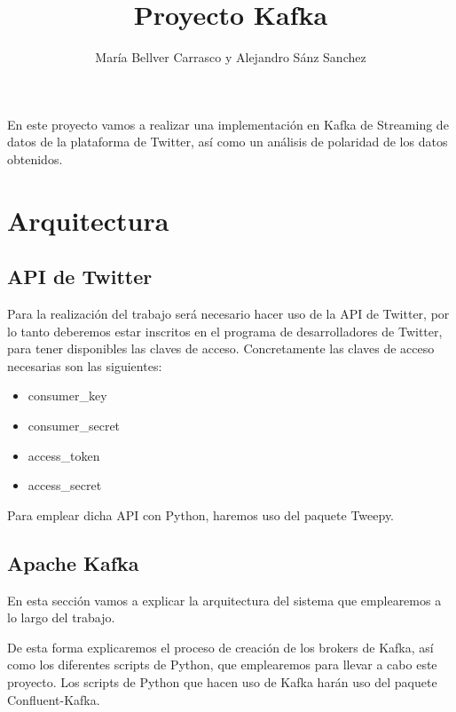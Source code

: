 \documentclass[12pt, a4paper, twoside]{article}
\title{Proyecto Kafka}
\author{María Bellver Carrasco y Alejandro Sánz Sanchez}
\begin{document}
\maketitle



En este proyecto vamos a realizar una implementación en Kafka de Streaming de datos de la plataforma de Twitter, así como un análisis de polaridad de los datos obtenidos.
	
\section{Arquitectura}
\subsection{API de Twitter}
	Para la realización del trabajo será necesario hacer uso de la API de Twitter, por lo tanto deberemos estar inscritos en el programa de desarrolladores de Twitter, para tener disponibles las claves de acceso. 
	Concretamente las claves de acceso necesarias son las siguientes:
	\begin{itemize}
	\item consumer\_key 
	\item consumer\_secret  
	\item access\_token 
	\item access\_secret 
	\end{itemize}
Para emplear dicha API con Python, haremos uso del paquete Tweepy.

\subsection{Apache Kafka}
	En esta sección vamos a explicar la arquitectura del sistema que emplearemos a lo largo del trabajo.
	
	De esta forma explicaremos el proceso de creación de los brokers de Kafka, así como los diferentes scripts de Python, que emplearemos para llevar a cabo este proyecto.  Los scripts de Python que hacen uso de Kafka harán uso del paquete Confluent-Kafka.
	
\end{document}
